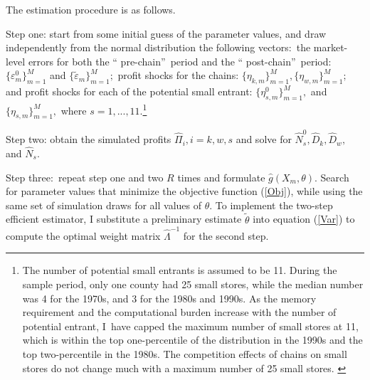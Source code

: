 \documentclass[notitlepage,onecolumn,11pt]{article}
\begin{document}
The estimation procedure is as follows.

Step one: start from some initial guess of the parameter values, and draw
independently from the normal distribution the following vectors:\ the
market-level errors for both the \textquotedblleft
pre-chain\textquotedblright\ period and the \textquotedblleft
post-chain\textquotedblright\ period: $\{\varepsilon _{m}^{0}\}_{m=1}^{M}$
and $\{\tilde{\varepsilon}_{m}\}_{m=1}^{M};$ profit shocks for the chains: $%
\{\eta _{k,m}\}_{m=1}^{M},\{\eta _{w,m}\}_{m=1}^{M};$ and profit shocks for
each of the potential small entrant: $\{\eta _{s,m}^{0}\}_{m=1}^{M},$ and $%
\{\eta _{s,m}\}_{m=1}^{M},$ where $s=1,...,11.$\footnote{%
The number of potential small entrants is assumed to be 11. During the
sample period, only one county had 25 small stores, while the median number
was 4 for the 1970s, and 3 for the 1980s and 1990s. As the memory
requirement and the computational burden increase with the number of
potential entrant, I\ have capped the maximum number of small stores at 11,
which is within the top one-percentile of the distribution in the 1990s and
the top two-percentile in the 1980s. The competition effects of chains on
small stores do not change much with a maximum number of 25 small stores.%
\label{SmNoFtNote}}

Step two: obtain the simulated profits $\hat{\Pi}_{i},i=k,w,s$ and solve for 
$\hat{N}_{s}^{0},\hat{D}_{k},\hat{D}_{w},$ and $\hat{N}_{s}$.

Step three:\ repeat step one and two $R$ times and formulate $\hat{g}%
(X_{m},\theta ).$ Search for parameter values that minimize the objective
function (\ref{Obj}), while using the same set of simulation draws for all
values of $\theta $. To implement the two-step efficient estimator, I
substitute a preliminary estimate $\tilde{\theta}$ into equation (\ref{Var})
to compute the optimal weight matrix $\hat{\Lambda}^{-1}$ for the second
step.
\end{document}
